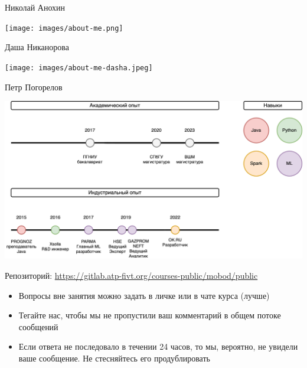 \documentclass[11pt,aspectratio=169,handout]{beamer}
\begin{document}
\begin{frame}{Николай Анохин}

\begin{center}
\texttt{[image: images/about-me.png]}
\end{center}

\end{frame}

\begin{frame}{Даша Никанорова}

\begin{center}
\texttt{[image: images/about-me-dasha.jpeg]}
\end{center}

\end{frame}

\begin{frame}{Петр Погорелов}

\begin{center}
\includegraphics[scale=0.23]{images/about-me-petr.png}
\end{center}

\end{frame}

\begin{frame}{}

Репозиторий: \url{https://gitlab.atp-fivt.org/courses-public/mobod/public}


\vfill

\begin{itemize}
\item Вопросы вне занятия можно задать в личке или в чате курса (лучше)
\item Тегайте нас, чтобы мы не пропустили ваш комментарий в общем потоке сообщений
\item Если ответа не последовало в течении 24 часов, то мы, вероятно, не увидели ваше сообщение. Не стесняйтесь его продублировать
\end{itemize}

\end{frame}
\end{document}
